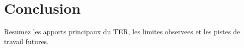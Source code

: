 \chapter{Conclusion}

Resumez les apports principaux du TER, les limites observees et les pistes de
travail futures.
